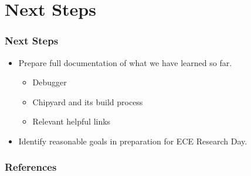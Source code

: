 \documentclass{../weeklyslides}
\begin{document}
\section{Next Steps}\label{sec:Next_Steps}
\begin{frame}
  \frametitle{Next Steps}
  \begin{itemize}
  \item Prepare full documentation of what we have learned so far.
    \begin{itemize}
    \item Debugger
    \item Chipyard and its build process
    \item Relevant helpful links
    \end{itemize}
  \item Identify reasonable goals in preparation for ECE Research Day.
  \end{itemize}
\end{frame}

\begin{frame}
  \frametitle{References}
  \printbibliography[heading=bibintoc]{}
\end{frame}
\end{document}
